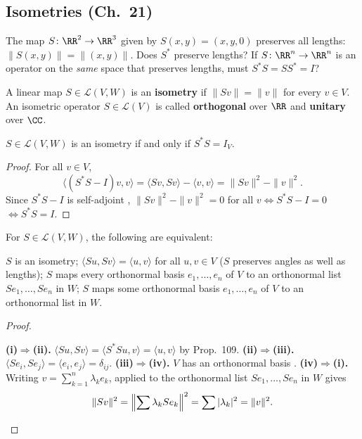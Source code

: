 \documentclass[10pt]{scrartcl}
\newcommand{\LL}{\mathcal L}\newcommand{\PP}{\mathcal P}\newcommand{\MM}{\mathcal M}
\begin{document}
\subsection{Isometries (Ch.~21)}

\begin{qbox}
  The map $S\colon\RR^2\to\RR^3$ given by $S(x,y)=(x,y,0)$ preserves all lengths: $\|S(x,y)\|=\|(x,y)\|$. Does $S^*$ preserve lengths? If $S\colon\RR^n\to\RR^n$ is an operator on the \emph{same} space that preserves lengths, must $S^*S=SS^*=I$?
\end{qbox}

\begin{definition*}
  A linear map $S\in\LL(V,W)$ is an \textbf{isometry} if $\|Sv\|=\|v\|$ for every $v\in V$. An isometric operator $S\in\LL(V)$ is called \textbf{orthogonal} over $\RR$ and \textbf{unitary} over $\CC$.
\end{definition*}

\begin{theorem*}[Prop.~109 / LADR 7.49: Isometry $\iff S^*S=I$]
  $S\in\LL(V,W)$ is an isometry if and only if $S^*S=I_V$.
\end{theorem*}
\begin{proof}
  For all $v\in V$,
  \[ \langle(S^*S-I)v,v\rangle = \langle Sv,Sv\rangle - \langle v,v\rangle = \|Sv\|^2 - \|v\|^2. \]
  Since $S^*S-I$ is self-adjoint , $\|Sv\|^2-\|v\|^2=0$ for all $v \iff S^*S-I=0$  $\iff S^*S=I$.
\end{proof}

\begin{theorem*}
  For $S\in\LL(V,W)$, the following are equivalent:
  \begin{enumerate}
    \ii[(i)] $S$ is an isometry;
    \ii[(ii)] $\langle Su,Sv\rangle = \langle u,v\rangle$ for all $u,v\in V$ ($S$ preserves angles as well as lengths);
    \ii[(iii)] $S$ maps every orthonormal basis $e_1,\dots,e_n$ of $V$ to an orthonormal list $Se_1,\dots,Se_n$ in $W$;
    \ii[(iv)] $S$ maps some orthonormal basis $e_1,\dots,e_n$ of $V$ to an orthonormal list in $W$.
  \end{enumerate}
\end{theorem*}
\begin{proof}
  \begin{steps}
    \ii \textbf{(i)$\Rightarrow$(ii).} $\langle Su,Sv\rangle=\langle S^*Su,v\rangle=\langle u,v\rangle$ by Prop.~109.
    \ii \textbf{(ii)$\Rightarrow$(iii).} $\langle Se_i,Se_j\rangle=\langle e_i,e_j\rangle=\delta_{ij}$.
    \ii \textbf{(iii)$\Rightarrow$(iv).} $V$ has an orthonormal basis .
    \ii \textbf{(iv)$\Rightarrow$(i).} Writing $v=\sum_{k=1}^n \lambda_k e_k$,  applied to the orthonormal list $Se_1,\dots,Se_n$ in $W$ gives
    \[ \|Sv\|^2 = \Bigl\|\sum \lambda_k Se_k\Bigr\|^2 = \sum |\lambda_k|^2 = \|v\|^2. \]
  \end{steps}
\end{proof}
\end{document}
